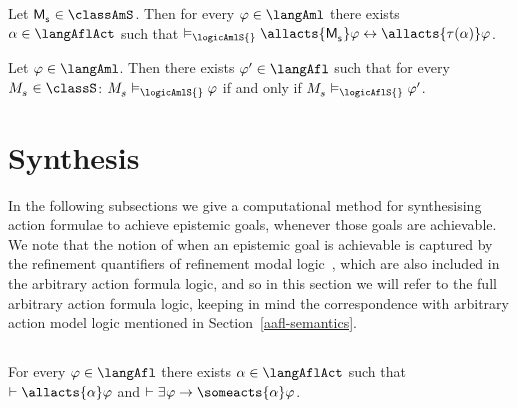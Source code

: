 \begin{corollary}
    Let $\aPModel{\aStateS} \in \classAmS$.
    Then for every $\phi \in \langAml$ there exists $\alpha \in \langAflAct$ such that $\entails_\logicAmlS{} \allacts{\aPModel{\aStateS}} \phi \iff \allacts{\tau(\alpha)} \phi$.
\end{corollary}

\begin{corollary}
    Let $\phi \in \langAml$. 
    Then there exists $\phi' \in \langAfl$ such that for every $\kPModel{\kStateS} \in \classS$: $\kPModel{\kStateS} \entails_\logicAmlS{} \phi$ if and only if $\kPModel{\kStateS} \entails_\logicAflS{} \phi'$.
\end{corollary}

\section{Synthesis}\label{synthesis}

In the following subsections we give a computational method for synthesising action formulae to achieve epistemic goals, whenever those goals are achievable.
We note that the notion of when an epistemic goal is achievable is captured by the refinement quantifiers of refinement modal logic~\cite{vanditmarsch:2009,bozzelli:2014b}, which are also included in the arbitrary action formula logic, and so in this section we will refer to the full arbitrary action formula logic, keeping in mind the correspondence with arbitrary action model logic mentioned in Section~\ref{aafl-semantics}.

\subsection{\classK{}}

\begin{proposition}\label{afl-k-synthesis}
    For every $\phi \in \langAfl$ there exists $\alpha \in \langAflAct$ such that $\proves \allacts{\alpha} \phi$ and $\proves \somerefs \phi \implies \someacts{\alpha} \phi$.
\end{proposition}

